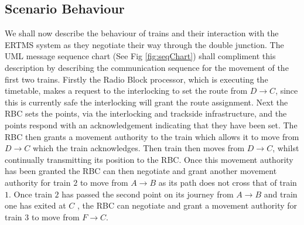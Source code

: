 \subsection*{Scenario Behaviour}
We shall now describe the behaviour of trains and their interaction with the ERTMS system as they negotiate their way through the double junction. The UML message sequence chart (See Fig \ref{fig:seqChart}) shall compliment this description by describing the communication sequence for the movement of the first two trains. Firstly the Radio Block processor, which is executing the timetable, makes a request to the interlocking to set the route from $D \to C$, since this is currently safe the interlocking will grant the route assignment. Next the RBC sets the points, via the interlocking and trackside infrastructure, and the points respond with an acknowledgement indicating that they have been set. The RBC then grants a movement authority to the train which allows it to move from $D \to C$ which the train acknowledges. Then train then moves from $D \to C$, whilst continually transmitting its position to the RBC. Once this movement authority has been granted the RBC can then negotiate and grant another movement authority for train $2$ to move from $A \to B$ as its path does not cross that of train $1$. Once train $2$ has passed the second point on its journey  from $A \to B$ and train one has exited at $C$ , the RBC can negotiate and grant a movement authority for train $3$ to move from $F \to C$.
